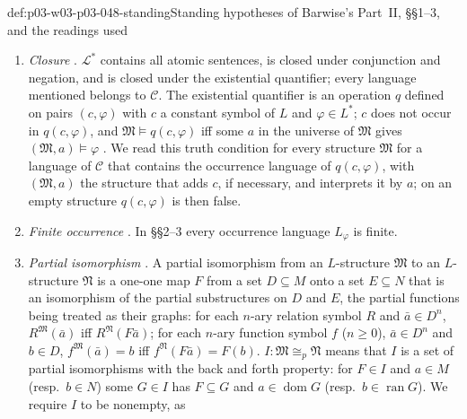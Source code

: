 \begin{hbconvention}{def:p03-w03-p03-048-standing}{Standing hypotheses of Barwise's Part~II, \S\S1--3, and the readings used}
\begin{enumerate}
\item \emph{Closure} \cite[Part~II, \S1, p.~248]{Barwise1974Axioms}.
      \(\mathcal L^{\ast}\) contains all atomic sentences, is closed under
      conjunction and negation, and is closed under the existential
      quantifier; every language mentioned belongs to \(\mathcal C\).  The
      existential quantifier is an operation \(q\) defined on pairs
      \((c,\varphi)\) with \(c\) a constant symbol of \(L\) and
      \(\varphi\in L^{\ast}\); \(c\) does not occur in \(q(c,\varphi)\), and
      \(\mathfrak M\models q(c,\varphi)\) iff some \(a\) in the universe of
      \(\mathfrak M\) gives \((\mathfrak M,a)\models\varphi\) \cite[Part~I,
      \S9, 9.3, 9.7, pp.~239, 241]{Barwise1974Axioms}.  We read this truth
      condition for every structure \(\mathfrak M\) for a language of
      \(\mathcal C\) that contains the occurrence language of
      \(q(c,\varphi)\), with \((\mathfrak M,a)\) the structure that adds
      \(c\), if necessary, and interprets it by \(a\); on an empty
      structure \(q(c,\varphi)\) is then false.
\item \emph{Finite occurrence} \cite[Part~II, \S2, p.~254]{Barwise1974Axioms}.
      In \S\S2--3 every occurrence language \(L_\varphi\) is finite.
\item \emph{Partial isomorphism} \cite[Part~I, \S10, 10.1,
      pp.~243--244]{Barwise1974Axioms}.  A partial isomorphism from an
      \(L\)-structure \(\mathfrak M\) to an \(L\)-structure \(\mathfrak N\) is
      a one-one map \(F\) from a set \(D\subseteq M\) onto a set
      \(E\subseteq N\) that is an isomorphism of the partial substructures
      on \(D\) and \(E\), the partial functions being treated as their
      graphs: for each \(n\)-ary relation symbol \(R\) and
      \(\bar a\in D^{n}\), \(R^{\mathfrak M}(\bar a)\) iff
      \(R^{\mathfrak N}(F\bar a)\); for each \(n\)-ary function symbol \(f\)
      (\(n\geq0\)), \(\bar a\in D^{n}\) and \(b\in D\),
      \(f^{\mathfrak M}(\bar a)=b\) iff \(f^{\mathfrak N}(F\bar a)=F(b)\).
      \(I:\mathfrak M\cong_{p}\mathfrak N\) means that \(I\) is a set of
      partial isomorphisms with the back and forth property: for
      \(F\in I\) and \(a\in M\) (resp.\ \(b\in N\)) some \(G\in I\) has
      \(F\subseteq G\) and \(a\in\operatorname{dom}G\) (resp.\
      \(b\in\operatorname{ran}G\)).  We require \(I\) to be nonempty, as

\end{enumerate}
\end{hbconvention}
